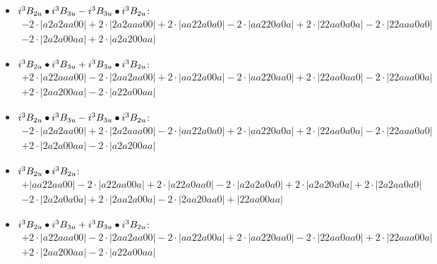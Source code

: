 \documentclass{article}
\begin{document}
\begin{itemize}
$$\begin{array}{c}
\end{array}$$
\item \boldmath$i^3 B_{2u} \bullet i^3 B_{3u} - i^3 B_{3u} \bullet i^3 B_{2u} \displaystyle $\unboldmath : \quad$$\begin{array}{c}
-2 \cdot \left|a2a2aa00\right| +2 \cdot \left|2a2aaa00\right| +2 \cdot \left|aa22a0a0\right| -2 \cdot \left|aa220a0a\right| +2 \cdot \left|22aa0a0a\right| -2 \cdot \left|22aaa0a0\right| \\[0.5cm] -2 \cdot \left|2a2a00aa\right| +2 \cdot \left|a2a200aa\right|
\end{array}$$
\item \boldmath$i^3 B_{2u} \bullet i^3 B_{3u} + i^3 B_{3u} \bullet i^3 B_{2u} \displaystyle $\unboldmath : \quad$$\begin{array}{c}
+2 \cdot \left|a22aaa00\right| -2 \cdot \left|2aa2aa00\right| +2 \cdot \left|aa22a00a\right| -2 \cdot \left|aa220aa0\right| +2 \cdot \left|22aa0aa0\right| -2 \cdot \left|22aaa00a\right| \\[0.5cm] +2 \cdot \left|2aa200aa\right| -2 \cdot \left|a22a00aa\right|
\end{array}$$
\item \boldmath$i^3 B_{2u} \bullet i^3 B_{3u} - i^3 B_{3u} \bullet i^3 B_{2u} \displaystyle $\unboldmath : \quad$$\begin{array}{c}
-2 \cdot \left|a2a2aa00\right| +2 \cdot \left|2a2aaa00\right| -2 \cdot \left|aa22a0a0\right| +2 \cdot \left|aa220a0a\right| +2 \cdot \left|22aa0a0a\right| -2 \cdot \left|22aaa0a0\right| \\[0.5cm] +2 \cdot \left|2a2a00aa\right| -2 \cdot \left|a2a200aa\right|
\end{array}$$
\item \boldmath$i^3 B_{2u} \bullet i^3 B_{2u} \displaystyle $\unboldmath : \quad$$\begin{array}{c}
+\left|aa22aa00\right| -2 \cdot \left|a22aa00a\right| +2 \cdot \left|a22a0aa0\right| -2 \cdot \left|a2a2a0a0\right| +2 \cdot \left|a2a20a0a\right| +2 \cdot \left|2a2aa0a0\right| \\[0.5cm] -2 \cdot \left|2a2a0a0a\right| +2 \cdot \left|2aa2a00a\right| -2 \cdot \left|2aa20aa0\right| +\left|22aa00aa\right|
\end{array}$$
\item \boldmath$i^3 B_{2u} \bullet i^3 B_{3u} + i^3 B_{3u} \bullet i^3 B_{2u} \displaystyle $\unboldmath : \quad$$\begin{array}{c}
+2 \cdot \left|a22aaa00\right| -2 \cdot \left|2aa2aa00\right| -2 \cdot \left|aa22a00a\right| +2 \cdot \left|aa220aa0\right| -2 \cdot \left|22aa0aa0\right| +2 \cdot \left|22aaa00a\right| \\[0.5cm] +2 \cdot \left|2aa200aa\right| -2 \cdot \left|a22a00aa\right|

\end{array}$$
\end{itemize}
\end{document}
